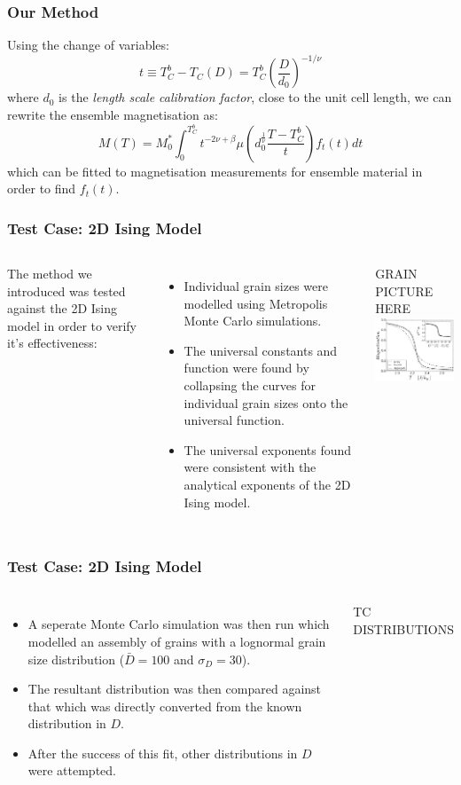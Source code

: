 \documentclass{beamer}
\begin{document}
\begin{frame}
	\frametitle{Our Method}
	Using the change of variables:
	$$
	t \equiv T_C^b - T_C(D) = T_C^b \left(\frac{D}{d_0}\right)^{-1/\nu}
	$$
	where $d_0$ is the \textit{length scale calibration factor}, close to the unit cell length, we can rewrite the ensemble magnetisation as:
	$$
	M(T) = M_0^*\int_0^{T_C^b} t^{-2\nu +\beta} \mu\left(d_0^{\frac{1}{\nu}}\frac{T-T_C^b}{t}\right) f_t(t) dt
	$$
	which can be fitted to magnetisation measurements for ensemble material in order to find $f_t(t)$.
\end{frame}

\begin{frame}
	\frametitle{Test Case: 2D Ising Model}
	\begin{columns}
	\column{7cm}
		The method we introduced was tested against the 2D Ising model in order to verify it's effectiveness:
		\begin{itemize}
		\item{Individual grain sizes were modelled using Metropolis Monte Carlo simulations.}
		\item{The universal constants and function were found by collapsing the curves for individual grain sizes onto the universal function.}
		\item{The universal exponents found were consistent with the analytical exponents of the 2D Ising model.}
		\end{itemize}
	\column{5cm}
		GRAIN PICTURE HERE
		\includegraphics[width=5cm]{Images/Ds}
	\end{columns}
\end{frame}

\begin{frame}
	\frametitle{Test Case: 2D Ising Model}
	\begin{columns}
	\column{7cm}
		\begin{itemize}
		\item{A seperate Monte Carlo simulation was then run which modelled an assembly of grains with a lognormal grain size distribution ($\bar{D}=100$ and $\sigma_D=30$).}
		\item{The resultant distribution was then compared against that which was directly converted from the known distribution in $D$.}
		\item{After the success of this fit, other distributions in $D$ were attempted.}
		\end{itemize}
	\column{5cm}
		TC DISTRIBUTIONS
	\end{columns}
\end{frame}
\end{document}
